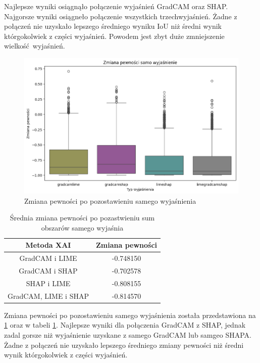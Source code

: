 Najlepsze wyniki osiągnąło połączenie wyjaśnień GradCAM oraz SHAP.
Najgorsze wyniki osiągneło połączenie wszystkich trzechwyjaśnień.
Żadne z połączeń nie uzyskało lepszego średniego wyniku  IoU niż średni wynik którgokolwiek z części wyjaśnień.
Powodem jest zbyt duże zmniejszenie wielkość wyjaśnień.

\begin{figure}
	\centering\includegraphics[width=.6\textwidth]{img/combine_confidence_exp_and}
	\caption{Zmiana pewności po pozostawieniu samego wyjaśnienia}  \label{rys:combineandconfidencean}
\end{figure}
\begin{table}
	\centering
	\begin{tabular}{|c|c|}
		\hline
		\textbf{Metoda XAI}  & Zmiana pewności \\
		\hline
		GradCAM i LIME       & -0.748150       \\
		\hline
		GradCAM i SHAP       & -0.702578       \\
		\hline
		SHAP i LIME          & -0.808155       \\
		\hline
		GradCAM, LIME i SHAP & -0.814570       \\
		\hline
	\end{tabular}
	\caption{Średnia zmiana pewności po pozastwieniu sum obszarów samego wyjaśnia}
	\label{tab:combineandconfidenceand}
\end{table}
Zmiana pewności po pozostawieniu samego wyjaśnienia została przedstawiona na \ref{rys:combineandconfidencean} oraz w tabeli \ref{tab:combineandconfidenceand}.
Najlepsze wyniki dla połączenia GradCAM z SHAP, jednak zadal gorsze niż wyjaśnienie uzyskane z samego GradCAM lub samgeo SHAPA.
Żadne z połączeń nie uzyskało lepszego średniego zmiany pewności niż średni wynik którgokolwiek z części wyjaśnień.

